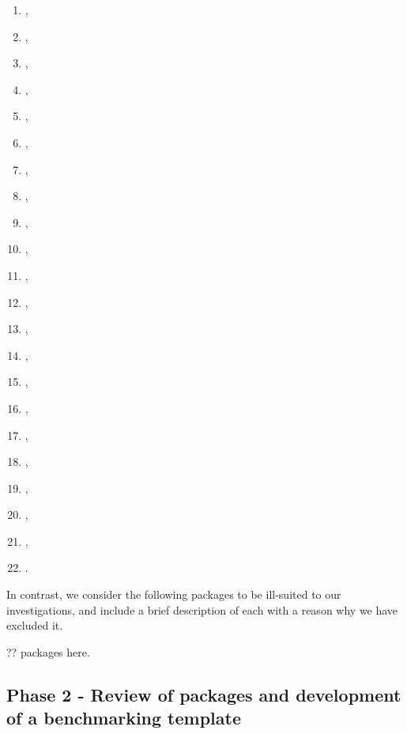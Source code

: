 \begin{enumerate}
\item
   \citep{R-quarrint},
\item
   \citep{R-radiant.model},
\item
   \citep{R-rasclass},
\item
   \citep{R-rcane},
\item
   \citep{R-regressoR},
\item
   \citep{R-rminer},
\item
   \citep{R-rnn},
\item
   \citep{R-RSNNS},
\item
   \citep{R-ruta},
\item
   \citep{R-simpleNeural},
\item
   \citep{R-snnR},
\item
   \citep{R-softmaxreg},
\item
   \citep{R-Sojourn.Data},
\item
   \citep{R-spnn},
\item
   \citep{R-TeachNet},
\item
   \citep{R-tensorflow},
\item
   \citep{R-tfestimators},
\item
   \citep{R-trackdem},
\item
   \citep{R-TrafficBDE},
\item
   \citep{R-tsensembler},
\item
   \citep{R-validann},
\item
   \citep{R-zFactor}.
\end{enumerate}

In contrast, we consider the following packages to be ill-suited to our
investigations, and include a brief description of each with a reason
why we have excluded it.

?? packages here.

\hypertarget{phase-2---review-of-packages-and-development-of-a-benchmarking-template}{%
\subsection{Phase 2 - Review of packages and development of a
benchmarking
template}\label{phase-2---review-of-packages-and-development-of-a-benchmarking-template}}

